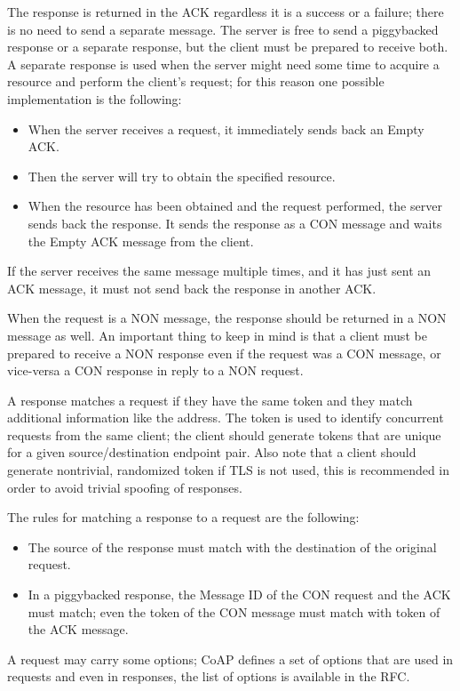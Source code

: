 	The response is returned in the ACK regardless it is a success or a failure; there is no need to send a separate message.\newline
	The server is free to send a piggybacked response or a separate response, but the client must be prepared to receive both.\newline
	A separate response is used when the server might need some time to acquire a resource and perform the client’s request; for this reason one possible implementation is the following:
	\begin{itemize}
		\item When the server receives a request, it immediately sends back an Empty ACK.
		\item Then the server will try to obtain the specified resource.
		\item When the resource has been obtained and the request performed, the server sends back the response.
		It sends the response as a CON message and waits the Empty ACK message from the client.
	\end{itemize}
	If the server receives the same message multiple times, and it has just sent an ACK message, it must not send back the response in another ACK.\newline
	
	When the request is a NON message, the response should be returned in a NON message as well.\newline
	An important thing to keep in mind is that a client must be prepared to receive a NON response even if the request was a CON message, or vice-versa a CON response in reply to a NON request.\newline
	
	A response matches a request if they have the same token and they match additional information like the address.\newline
	The token is used to identify concurrent requests from the same client; the client should generate tokens that are unique for a given source/destination endpoint pair.\newline
	Also note that a client should generate nontrivial, randomized token if TLS is not used, this is recommended in order to avoid trivial spoofing of responses.\newline
	
	The rules for matching a response to a request are the following:
	\begin{itemize}
		\item The source of the response must match with the destination of the original request.
		\item In a piggybacked response, the Message ID of the CON request and the ACK must match; even the token of the CON message must match with token of the ACK message.
	\end{itemize}
	A request may carry some options; CoAP defines a set of options that are used in requests and even in responses,
	the list of options is available in the RFC.
	
